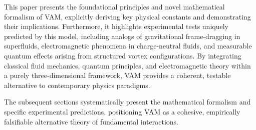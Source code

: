 This paper presents the foundational principles and novel mathematical formalism of VAM, explicitly deriving key physical constants and demonstrating their implications. Furthermore, it highlights experimental tests uniquely predicted by this model, including analogs of gravitational frame-dragging in superfluids, electromagnetic phenomena in charge-neutral fluids, and measurable quantum effects arising from structured vortex configurations. By integrating classical fluid mechanics, quantum principles, and electromagnetic theory within a purely three-dimensional framework, VAM provides a coherent, testable alternative to contemporary physics paradigms.

The subsequent sections systematically present the mathematical formalism and specific experimental predictions, positioning VAM as a cohesive, empirically falsifiable alternative theory of fundamental interactions.